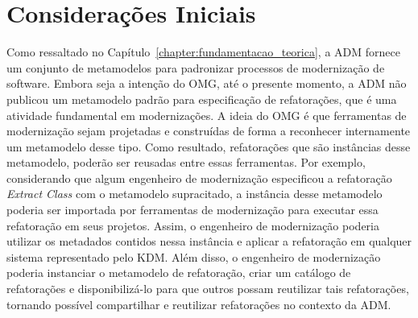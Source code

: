 \section{Considerações Iniciais}\label{sec:consideracoes_iniciais}

Como ressaltado no Capítulo~\ref{chapter:fundamentacao_teorica}, a ADM fornece um conjunto de metamodelos para padronizar processos de modernização de software. Embora seja a intenção do OMG, até o presente  momento, a ADM não publicou um metamodelo padrão para especificação de refatorações, que é uma atividade fundamental em modernizações. A ideia do OMG é que ferramentas de modernização sejam projetadas e construídas de forma a reconhecer internamente um metamodelo desse tipo. Como resultado, refatorações que são instâncias desse metamodelo, poderão ser reusadas entre essas ferramentas. Por exemplo, considerando que algum engenheiro de modernização especificou a refatoração \textit{Extract Class} com o metamodelo supracitado, a instância desse metamodelo poderia ser importada por ferramentas de modernização para executar essa refatoração em seus projetos. Assim, o engenheiro de modernização poderia utilizar os metadados contidos nessa instância e aplicar a refatoração em qualquer sistema representado pelo KDM. Além disso, o engenheiro de modernização poderia instanciar o metamodelo de refatoração, criar um catálogo de refatorações e disponibilizá-lo para que outros possam reutilizar tais refatorações, tornando possível compartilhar e reutilizar refatorações no contexto da ADM.





